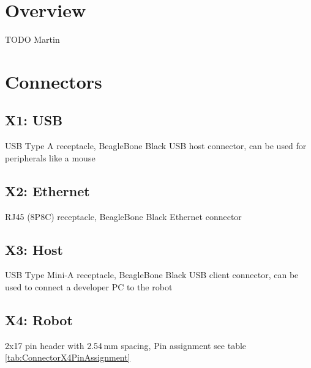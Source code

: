 \section{Overview}
TODO Martin

\section{Connectors}

\subsection{X1: USB}
USB Type A receptacle, BeagleBone Black USB host connector, can be used for peripherals like a mouse

\subsection{X2: Ethernet}
RJ45 (8P8C) receptacle, BeagleBone Black Ethernet connector

\subsection{X3: Host}
USB Type Mini-A receptacle, BeagleBone Black USB client connector, can be used to connect a developer PC to the robot

\subsection{X4: Robot}
2x17 pin header with 2.54\,mm spacing, Pin assignment see table \ref{tab:ConnectorX4PinAssignment}

